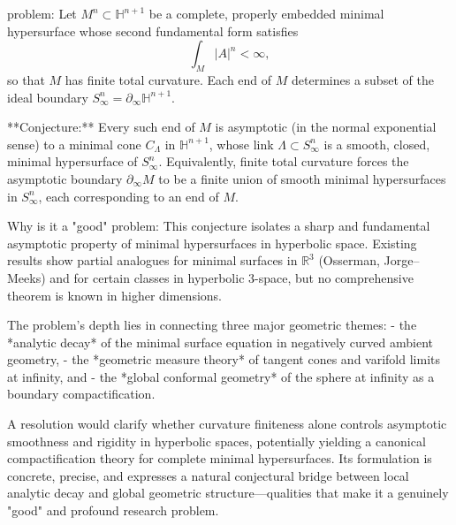 problem:  
Let \( M^n \subset \mathbb{H}^{n+1} \) be a complete, properly embedded minimal hypersurface whose second fundamental form satisfies     
\[
\int_M |A|^n < \infty,
\]
so that \(M\) has finite total curvature.  
Each end of \(M\) determines a subset of the ideal boundary \(S^n_\infty = \partial_\infty \mathbb{H}^{n+1}\).  

**Conjecture:**  
Every such end of \(M\) is asymptotic (in the normal exponential sense) to a minimal cone \(C_\Lambda\) in \(\mathbb{H}^{n+1}\), whose link \(\Lambda \subset S^n_\infty\) is a smooth, closed, minimal hypersurface of \(S^n_\infty\).  
Equivalently, finite total curvature forces the asymptotic boundary \(\partial_\infty M\) to be a finite union of smooth minimal hypersurfaces in \(S^n_\infty\), each corresponding to an end of \(M\).  

Why is it a "good" problem:  
This conjecture isolates a sharp and fundamental asymptotic property of minimal hypersurfaces in hyperbolic space. Existing results show partial analogues for minimal surfaces in \(\mathbb{R}^3\) (Osserman, Jorge–Meeks) and for certain classes in hyperbolic \(3\)-space, but no comprehensive theorem is known in higher dimensions.  

The problem’s depth lies in connecting three major geometric themes:  
- the *analytic decay* of the minimal surface equation in negatively curved ambient geometry,  
- the *geometric measure theory* of tangent cones and varifold limits at infinity, and  
- the *global conformal geometry* of the sphere at infinity as a boundary compactification.  

A resolution would clarify whether curvature finiteness alone controls asymptotic smoothness and rigidity in hyperbolic spaces, potentially yielding a canonical compactification theory for complete minimal hypersurfaces.  
Its formulation is concrete, precise, and expresses a natural conjectural bridge between local analytic decay and global geometric structure—qualities that make it a genuinely "good" and profound research problem.